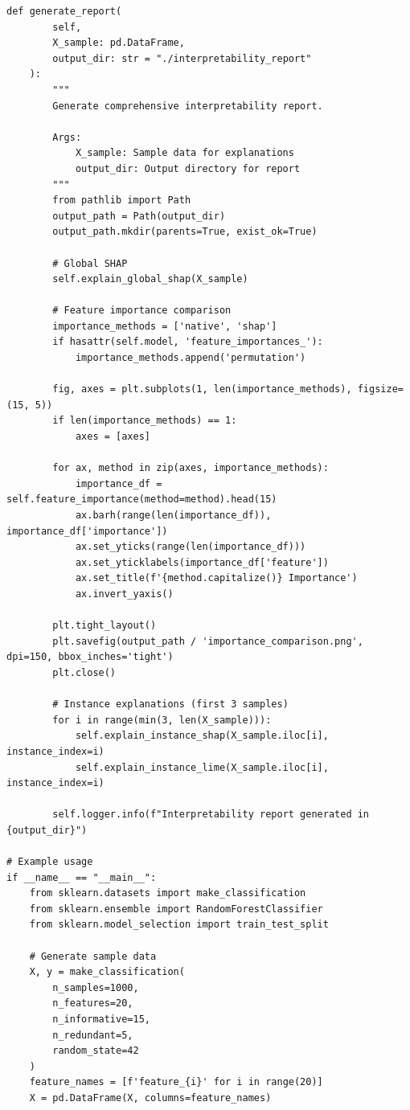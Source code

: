 \begin{lstlisting}[style=python, caption={Model Interpretability Framework with SHAP and LIME}]
    def generate_report(
        self,
        X_sample: pd.DataFrame,
        output_dir: str = "./interpretability_report"
    ):
        """
        Generate comprehensive interpretability report.

        Args:
            X_sample: Sample data for explanations
            output_dir: Output directory for report
        """
        from pathlib import Path
        output_path = Path(output_dir)
        output_path.mkdir(parents=True, exist_ok=True)

        # Global SHAP
        self.explain_global_shap(X_sample)

        # Feature importance comparison
        importance_methods = ['native', 'shap']
        if hasattr(self.model, 'feature_importances_'):
            importance_methods.append('permutation')

        fig, axes = plt.subplots(1, len(importance_methods), figsize=(15, 5))
        if len(importance_methods) == 1:
            axes = [axes]

        for ax, method in zip(axes, importance_methods):
            importance_df = self.feature_importance(method=method).head(15)
            ax.barh(range(len(importance_df)), importance_df['importance'])
            ax.set_yticks(range(len(importance_df)))
            ax.set_yticklabels(importance_df['feature'])
            ax.set_title(f'{method.capitalize()} Importance')
            ax.invert_yaxis()

        plt.tight_layout()
        plt.savefig(output_path / 'importance_comparison.png', dpi=150, bbox_inches='tight')
        plt.close()

        # Instance explanations (first 3 samples)
        for i in range(min(3, len(X_sample))):
            self.explain_instance_shap(X_sample.iloc[i], instance_index=i)
            self.explain_instance_lime(X_sample.iloc[i], instance_index=i)

        self.logger.info(f"Interpretability report generated in {output_dir}")

# Example usage
if __name__ == "__main__":
    from sklearn.datasets import make_classification
    from sklearn.ensemble import RandomForestClassifier
    from sklearn.model_selection import train_test_split

    # Generate sample data
    X, y = make_classification(
        n_samples=1000,
        n_features=20,
        n_informative=15,
        n_redundant=5,
        random_state=42
    )
    feature_names = [f'feature_{i}' for i in range(20)]
    X = pd.DataFrame(X, columns=feature_names)


\end{lstlisting}

